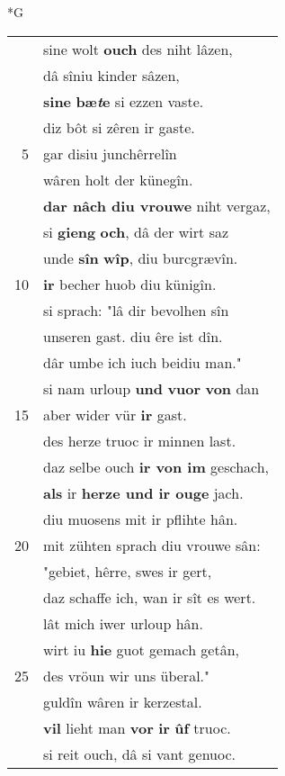 \documentclass[8pt,a4paper,notitlepage]{article}
\begin{document}
\begin{table}[ht]
\begin{minipage}[t]{0.5\linewidth}
\small
\begin{center}*G
\end{center}
\begin{tabular}{rl}
 & sine wolt \textbf{ouch} des niht lâzen,\\ 
 & dâ sîniu kinder sâzen,\\ 
 & \textbf{si}\textbf{ne} \textbf{bæ\textit{t}e} si ezzen vaste.\\ 
 & diz bôt si zêren ir gaste.\\ 
5 & gar disiu junchêrrelîn\\ 
 & wâren holt der künegîn.\\ 
 & \textbf{dar nâch diu vrouwe} niht vergaz,\\ 
 & si \textbf{gieng} \textbf{och}, dâ der wirt saz\\ 
 & unde \textbf{sîn} \textbf{wîp}, diu burcgrævîn.\\ 
10 & \textbf{ir} becher huob diu künigîn.\\ 
 & si sprach: "lâ dir bevolhen sîn\\ 
 & unseren gast. diu êre ist dîn.\\ 
 & dâr umbe ich iuch beidiu man."\\ 
 & si nam urloup \textbf{und} \textbf{vuor} \textbf{von} dan\\ 
15 & aber wider vür \textbf{ir} gast.\\ 
 & des herze truoc ir minnen last.\\ 
 & daz selbe ouch \textbf{ir von im} geschach,\\ 
 & \textbf{als} ir \textbf{herze und ir ouge} jach.\\ 
 & diu muosens mit ir pflihte hân.\\ 
20 & mit zühten sprach diu vrouwe sân:\\ 
 & "gebiet, hêrre, swes ir gert,\\ 
 & daz schaffe ich, wan ir sît es wert.\\ 
 & lât mich iwer urloup hân.\\ 
 & wirt iu \textbf{hie} guot gemach getân,\\ 
25 & des vröun wir uns überal."\\ 
 & guldîn wâren ir kerzestal.\\ 
 & \textbf{vil} lieht man \textbf{vor} \textbf{ir} \textbf{ûf} truoc.\\ 
 & si reit ouch, dâ si vant genuoc.\\ 

\end{tabular}
\end{minipage}
\end{table}
\end{document}
